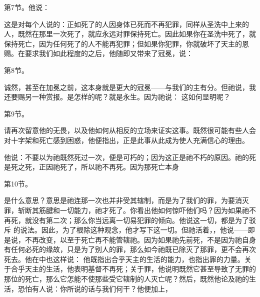 第7节。他说：\par

这是对每个人说的：正如死了的人因身体已死而不再犯罪，同样从圣洗中上来的人，既然在那里一次死了，就应永远对罪保持死亡。因此如果你在圣洗中死了，就保持死亡，因为任何死了的人不能再犯罪；但如果你犯罪，你就破坏了天主的恩赐。在要求我们如此程度的之后，他随即又带来了冠冕，说：\par

第8节。\par

诚然，甚至在加冕之前，这本身就是更大的冠冕——与我们的主有分。但祂说，我还要赐另一种赏报。是怎样的呢？就是永生。因为祂说： 这如何显明呢？\par

第9节。\par

请再次留意他的无畏，以及他如何从相反的立场来证实这事。既然很可能有些人会对十字架和死亡感到困惑，他便指出，正是此事从此成为使人充满信心的理由。\par

他说：不要以为祂既然死过一次，便是可朽的；因为这正是祂不朽的原因。祂的死是死之死，正因祂死了，所以祂不再死。因为那死亡本身\par

第10节。\par

 是什么意思？意思是祂连那一次也并非受其辖制，而是为了我们的罪，为要消灭罪，斩断其筋腱和一切能力，祂才死了。你看出他如何惊吓他们吗？因为如果祂不再死，就没有第二次；那么你当远离一切易犯罪的倾向。他说这一切，都是为了驳斥 的说法。因此，为了根除这种观念，他才写下这一切。但祂活着，，他说——即是说，不再改变，以至于死亡再不能管辖祂。因为如果祂先前死，不是因为祂自身有任何必死的缘故，只是为了别人的罪，那么如今祂既已除灭了那罪，更不会再次死去。他在中也这样说： 他既指出合乎天主的生活的能力，也指出罪的力量。关于合乎天主的生活，他表明基督不再死；关于罪，他说明既然它甚至导致了无罪的那位的死亡，那么它怎能不使那些受它辖制的人灭亡呢？然后，既然他论及祂的生活，恐怕有人说：你所说的话与我们何干？他便加上，\par

